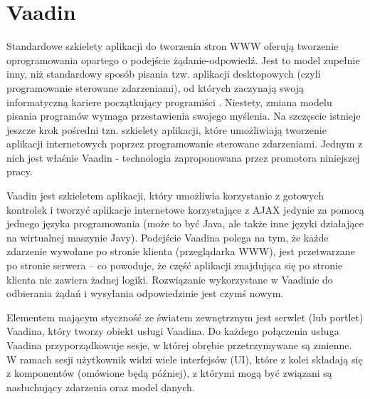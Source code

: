 \section{Vaadin}
Standardowe szkielety aplikacji do tworzenia stron WWW oferują tworzenie oprogramowania opartego o podejście żądanie-odpowiedź. Jest to model zupełnie inny, niż standardowy sposób pisania tzw. aplikacji desktopowych (czyli programowanie sterowane zdarzeniami), od których zaczynają swoją informatyczną kariere początkujący programiści . Niestety, zmiana modelu pisania programów wymaga przestawienia swojego myślenia. Na szczęscie istnieje jeszcze krok pośredni tzn. szkielety aplikacji, które umożliwiają tworzenie aplikacji internetowych poprzez programowanie sterowane zdarzeniami. Jednym z nich jest właśnie Vaadin - technologia zaproponowana przez promotora niniejszej pracy.

Vaadin jest szkieletem aplikacji, który umożliwia korzystanie z gotowych kontrolek i tworzyć aplikacje internetowe korzystające z AJAX jedynie za pomocą jednego języka programowania (może to być Java, ale także inne języki działające na wirtualnej maszynie Javy). Podejście Vaadina polega na tym, że każde zdarzenie wywołane po stronie klienta (przeglądarka WWW), jest przetwarzane po stronie serwera – co powoduje, że część aplikacji znajdująca się po stronie klienta nie zawiera żadnej logiki. Rozwiązanie wykorzystane w Vaadinie do odbierania żądań i wysyłania odpowiedzinie jest czymś nowym.

Elementem mającym styczność ze światem zewnętrznym jest serwlet (lub portlet) Vaadina, który tworzy obiekt usługi Vaadina. Do każdego połączenia usługa Vaadina przyporządkowuje sesje, w której obrębie przetrzymywane są zmienne. W ramach sesji użytkownik widzi wiele interfejsów (UI), które z kolei składają się z komponentów (omówione będą później), z którymi mogą być związani są nasłuchujący zdarzenia oraz model danych. 

